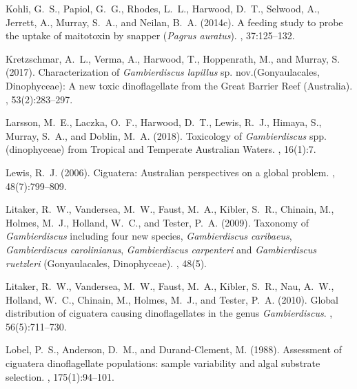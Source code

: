 \documentclass[10pt,letterpaper]{article}
\begin{document}
\begin{thebibliography}{10}
Kohli, G.~S., Papiol, G.~G., Rhodes, L.~L., Harwood, D.~T., Selwood, A.,
  Jerrett, A., Murray, S.~A., and Neilan, B.~A. (2014c).
\newblock A feeding study to probe the uptake of maitotoxin by snapper
  (\emph{Pagrus auratus}).
, 37:125--132.

Kretzschmar, A.~L., Verma, A., Harwood, T., Hoppenrath, M., and Murray, S.
  (2017).
\newblock Characterization of \emph{Gambierdiscus lapillus} sp.
  nov.({G}onyaulacales, {D}inophyceae): A new toxic dinoflagellate from the
  {G}reat {B}arrier {R}eef ({A}ustralia).
, 53(2):283--297.

Larsson, M.~E., Laczka, O.~F., Harwood, D.~T., Lewis, R.~J., Himaya, S.,
  Murray, S.~A., and Doblin, M.~A. (2018).
\newblock Toxicology of \emph{Gambierdiscus} spp.(dinophyceae) from {T}ropical
  and {T}emperate {A}ustralian {W}aters.
, 16(1):7.

Lewis, R.~J. (2006).
\newblock Ciguatera: {A}ustralian perspectives on a global problem.
, 48(7):799--809.

Litaker, R.~W., Vandersea, M.~W., Faust, M.~A., Kibler, S.~R., Chinain, M.,
  Holmes, M.~J., Holland, W.~C., and Tester, P.~A. (2009).
\newblock Taxonomy of \emph{Gambierdiscus} including four new species,
  \emph{Gambierdiscus caribaeus}, \emph{Gambierdiscus carolinianus},
  \emph{Gambierdiscus carpenteri} and \emph{Gambierdiscus ruetzleri}
  ({G}onyaulacales, {D}inophyceae).
, 48(5).

Litaker, R.~W., Vandersea, M.~W., Faust, M.~A., Kibler, S.~R., Nau, A.~W.,
  Holland, W.~C., Chinain, M., Holmes, M.~J., and Tester, P.~A. (2010).
\newblock Global distribution of ciguatera causing dinoflagellates in the genus
  \emph{Gambierdiscus}.
, 56(5):711--730.

Lobel, P.~S., Anderson, D.~M., and Durand-Clement, M. (1988).
\newblock Assessment of ciguatera dinoflagellate populations: sample
  variability and algal substrate selection.
, 175(1):94--101.


\end{thebibliography}
\end{document}
